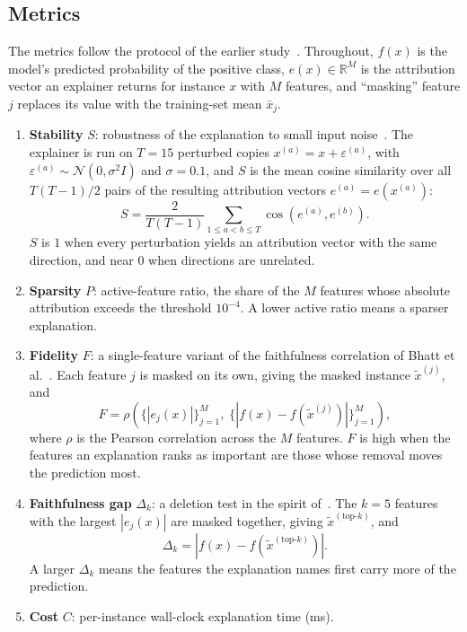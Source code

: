 \documentclass{cleiej}
\begin{document}
\subsection{Metrics}
\label{sec:metrics}

The metrics follow the protocol of the earlier
study~\cite{herrera2026framework}. Throughout, $f(x)$ is the model's
predicted probability of the positive class, $e(x) \in \mathbb{R}^{M}$ is
the attribution vector an explainer returns for instance $x$ with $M$
features, and ``masking'' feature $j$ replaces its value with the
training-set mean $\bar{x}_j$.
\begin{enumerate}
\item \textbf{Stability} $S$: robustness of the explanation to small input
noise~\cite{alvarezmelis2018robustness}. The explainer is run on $T=15$
perturbed copies $x^{(a)} = x + \varepsilon^{(a)}$, with
$\varepsilon^{(a)} \sim \mathcal{N}(0, \sigma^2 I)$ and $\sigma=0.1$,
and $S$ is the mean cosine similarity over all $T(T-1)/2$ pairs of
the resulting attribution vectors $e^{(a)} = e(x^{(a)})$:
\begin{equation}
S = \frac{2}{T(T-1)}\sum_{1 \le a<b \le T}\cos\!\left(e^{(a)},e^{(b)}\right).
\label{eq:stability}
\end{equation}
$S$ is $1$ when every perturbation yields an attribution vector with the
same direction, and near $0$ when directions are unrelated.
\item \textbf{Sparsity} $P$: active-feature ratio, the share of the $M$
features whose absolute attribution exceeds the threshold $10^{-4}$. A
lower active ratio means a sparser explanation.
\item \textbf{Fidelity} $F$: a single-feature variant of the faithfulness
correlation of Bhatt et al.~\cite{bhatt2020evaluating}. Each feature $j$ is
masked on its own, giving the masked instance $\tilde{x}^{(j)}$, and
\begin{equation}
F = \rho\!\left(\bigl\{|e_j(x)|\bigr\}_{j=1}^{M},\;
\bigl\{|f(x) - f(\tilde{x}^{(j)})|\bigr\}_{j=1}^{M}\right),
\label{eq:fidelity}
\end{equation}
where $\rho$ is the Pearson correlation across the $M$ features. $F$ is
high when the features an explanation ranks as important are those whose
removal moves the prediction most.
\item \textbf{Faithfulness gap} $\Delta_k$: a deletion test in the spirit
of~\cite{samek2017evaluating,hooker2019benchmark}. The $k=5$ features with
the largest $|e_j(x)|$ are masked together, giving
$\tilde{x}^{(\mathrm{top}\text{-}k)}$, and
\begin{equation}
\Delta_k = \left|f(x) - f\!\left(\tilde{x}^{(\mathrm{top}\text{-}k)}\right)\right|.
\label{eq:gap}
\end{equation}
A larger $\Delta_k$ means the features the explanation names first carry
more of the prediction.
\item \textbf{Cost} $C$: per-instance wall-clock explanation time (ms).
\end{enumerate}
\end{document}
